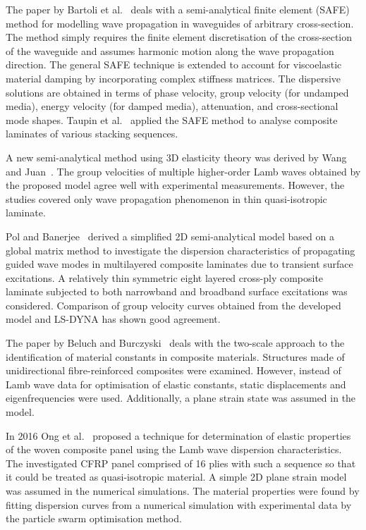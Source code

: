 	The paper by Bartoli et al.~\cite{Bartoli2006} deals with a semi-analytical finite element (SAFE) method for modelling wave propagation in waveguides of arbitrary cross-section. The method simply requires the finite element discretisation of the cross-section of the waveguide and assumes harmonic motion along the wave propagation direction. The general SAFE technique is extended to account for viscoelastic material damping by incorporating complex stiffness matrices. The dispersive solutions are obtained in terms of phase velocity, group velocity (for undamped media), energy velocity (for damped media), attenuation, and cross-sectional mode shapes. Taupin et al.~\cite{Taupin2011} applied the SAFE method to analyse composite laminates of various stacking sequences.
	
	A new semi-analytical method using 3D elasticity theory was derived by Wang and Juan~\cite{Wang2007}. The group velocities of multiple higher-order Lamb waves obtained by the proposed model agree well with experimental measurements. However, the studies covered only wave propagation phenomenon in thin quasi-isotropic laminate. 
	
	Pol and Banerjee~\cite{Pol2013} derived a simplified 2D semi-analytical model based on a global matrix method to investigate the dispersion characteristics of propagating guided wave modes in multilayered composite laminates due to transient surface excitations. A relatively thin symmetric eight layered cross-ply composite laminate subjected to both narrowband and broadband surface excitations was considered. Comparison of group velocity curves obtained from the developed model and LS-DYNA has shown good agreement.
	
	The paper by Beluch and Burczyski~\cite{Beluch2014} deals with the two-scale approach to the identification of material constants in composite materials. Structures made of unidirectional fibre-reinforced composites were examined. However, instead of Lamb wave data for optimisation of elastic constants, static displacements and eigenfrequencies were used. Additionally, a plane strain state was assumed in the model.
	
	In 2016 Ong et al.~\cite{Ong2016} proposed a technique for determination of elastic properties of the woven composite panel using the Lamb wave dispersion characteristics. The investigated CFRP panel comprised of 16 plies with such a sequence so that it could be treated as quasi-isotropic material. A simple 2D plane strain model was assumed in the numerical simulations. The material properties were found by fitting dispersion curves from a numerical simulation with experimental data by the particle swarm optimisation method. 
	
